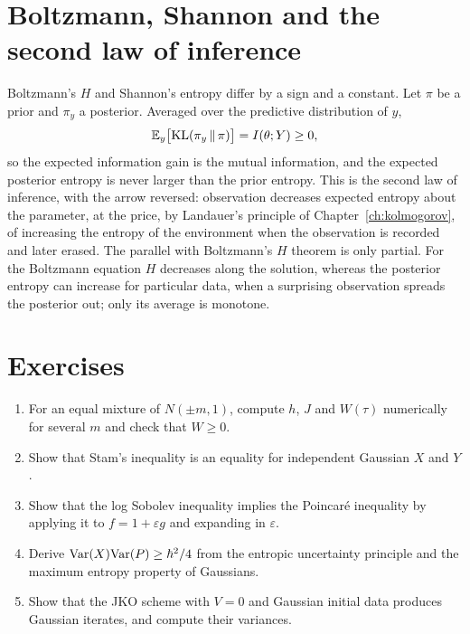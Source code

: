\section{Boltzmann, Shannon and the second law of inference}

Boltzmann's $H$ and Shannon's entropy differ by a sign and a constant. Let $\pi$ be a prior and $\pi_y$ a posterior. Averaged over the predictive distribution of $y$,
\[
\mathbb{E}_y\big[\mathrm{KL}(\pi_y\,\|\,\pi)\big] = I(\theta;Y)\geq0,
\]
so the expected information gain is the mutual information, and the expected posterior entropy is never larger than the prior entropy. This is the second law of inference, with the arrow reversed: observation decreases expected entropy about the parameter, at the price, by Landauer's principle of Chapter~\ref{ch:kolmogorov}, of increasing the entropy of the environment when the observation is recorded and later erased. The parallel with Boltzmann's $H$ theorem is only partial. For the Boltzmann equation $H$ decreases along the solution, whereas the posterior entropy can increase for particular data, when a surprising observation spreads the posterior out; only its average is monotone.

\section*{Exercises}
\begin{enumerate}
\item For an equal mixture of $N(\pm m,1)$, compute $h$, $J$ and $W(\tau)$ numerically for several $m$ and check that $W\geq0$.
\item Show that Stam's inequality is an equality for independent Gaussian $X$ and $Y$.
\item Show that the log Sobolev inequality implies the Poincar\'e inequality by applying it to $f = 1+\varepsilon g$ and expanding in $\varepsilon$.
\item Derive $\mathrm{Var}(X)\mathrm{Var}(P)\geq\hbar^2/4$ from the entropic uncertainty principle and the maximum entropy property of Gaussians.
\item Show that the JKO scheme with $V = 0$ and Gaussian initial data produces Gaussian iterates, and compute their variances.
\end{enumerate}
